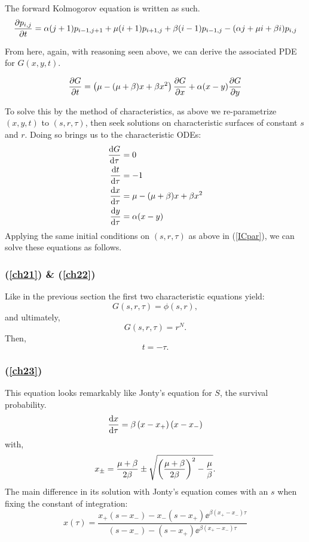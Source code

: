 The forward Kolmogorov equation is written as such.
\begin{equation*}
\label{FK3}
\displaystyle\frac{\partial p_{i,j} }{\partial t} = \alpha(j + 1) p_{i-1,j+1} + \mu(i+1)p_{i+1,j}  +  \beta(i-1)p_{i-1,j}    -  (\alpha j + \mu i+\beta i) p_{i,j} 
\end{equation*}

From here, again, with reasoning seen above, we can derive the associated PDE for $G(x,y,t)$.

\begin{equation}
\displaystyle\frac{\partial G}{\partial t} = \left(\mu - (\mu+ \beta)x + \beta x^2\right)\displaystyle\frac{\partial G}{\partial x} + \alpha(x-y)\displaystyle\frac{\partial G}{\partial y}
\end{equation}

To solve this by the method of characteristics, as above we re-parametrize $(x,y,t)$ to $(s,r,\tau)$, then seek solutions on characteristic surfaces of constant $s$ and $r$. Doing so brings us to the characteristic ODEs: 
\begin{align}
\displaystyle\frac{{\rm d} G}{{\rm d} \tau} &= 0\label{ch21}\\
\displaystyle\frac{{\rm d} t}{{\rm d} \tau} &= -1\label{ch22}\\
\displaystyle\frac{{\rm d} x}{{\rm d} \tau} &= \mu-(\mu+\beta)x + \beta x^2\label{ch23}\\
\displaystyle\frac{{\rm d} y}{{\rm d} \tau} &= \alpha(x-y)\label{ch24}
\end{align}
Applying the same initial conditions on $(s,r,\tau)$ as above in (\ref{ICpar}), we can solve these equations as follows.

\subsubsection*{(\ref{ch21}) \& (\ref{ch22})}
Like in the previous section the first two characteristic equations yield: 
$$G(s,r,\tau) = \phi(s,r),$$
and ultimately,
\begin{equation}
\label{gngngn}
G(s,r,\tau) = r^N.
\end{equation}
Then,
$$t = -\tau.$$   


\subsubsection*{(\ref{ch23})}
This equation looks remarkably like Jonty's equation for $S$, the survival probability. 
$$\displaystyle\frac{{\rm d} x}{{\rm d} \tau} = \beta\left( x-x_+\right)\left( x-x_-\right)$$
with,
$$x_{\pm} = \frac{\mu + \beta}{2\beta} \pm \sqrt{\left(\frac{\mu + \beta}{2\beta}\right)^2 - \frac{\mu}{\beta}}.$$
The main difference in its solution with Jonty's equation comes with an $s$ when fixing the constant of integration:
\begin{equation}
x(\tau) = \frac{x_+(s-x_-) - x_-(s-x_+)\ee^{\beta(x_+-x_-)\tau}}{(s-x_-) - (s-x_+)\ee^{\beta(x_+-x_-) \tau}}
\label{xabd}
\end{equation}


